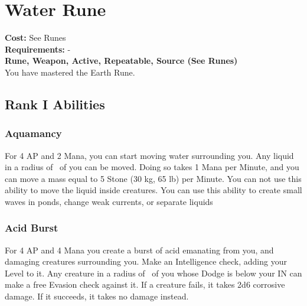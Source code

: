 \section{Water Rune}\label{rune:water}
\textbf{Cost:} See Runes\\
\textbf{Requirements:} -\\
\textbf{Rune, Weapon, Active, Repeatable, Source (See Runes)}\\
You have mastered the Earth Rune.

\subsection{Rank I Abilities}

\subsubsection{Aquamancy}
For 4 AP and 2 Mana, you can start moving water surrounding you.
Any liquid in a radius of~ of you can be moved.
Doing so takes 1 Mana per Minute, and you can move a mass equal to 5 Stone (30 kg, 65 lb) per Minute.
You can not use this ability to move the liquid inside creatures.
You can use this ability to create small waves in ponds, change weak currents, or separate liquids

\subsubsection{Acid Burst}
For 4 AP and 4 Mana you create a burst of acid emanating from you, and damaging creatures surrounding you.
Make an Intelligence check, adding your Level to it.
Any creature in a radius of~ of you whose Dodge is below your IN can make a free Evasion check against it.
If a creature fails, it takes 2d6 corrosive damage.
If it succeeds, it takes no damage instead.